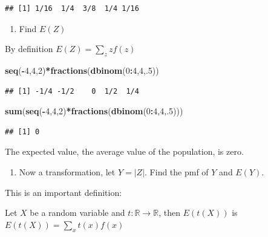 \documentclass[]{book}
\newenvironment{Shaded}{\begin{snugshade}}{\end{snugshade}}
\newcommand{\KeywordTok}[1]{\textcolor[rgb]{0.13,0.29,0.53}{\textbf{#1}}}
\newcommand{\DecValTok}[1]{\textcolor[rgb]{0.00,0.00,0.81}{#1}}
\newcommand{\OperatorTok}[1]{\textcolor[rgb]{0.81,0.36,0.00}{\textbf{#1}}}
\newcommand{\NormalTok}[1]{#1}
\providecommand{\tightlist}{%
  \setlength{\itemsep}{0pt}\setlength{\parskip}{0pt}}
\theoremstyle{definition}
\theoremstyle{definition}
\theoremstyle{definition}
\theoremstyle{remark}
\begin{document}
\begin{verbatim}
## [1] 1/16  1/4  3/8  1/4 1/16
\end{verbatim}

\begin{enumerate}
\def\labelenumi{\arabic{enumi}.}
\tightlist
\item
  Find \(E(Z)\)
\end{enumerate}

By definition \(E(Z)=\sum_{z}zf(z)\)

\begin{Shaded}
\begin{Highlighting}[]
\KeywordTok{seq}\NormalTok{(}\OperatorTok{-}\DecValTok{4}\NormalTok{,}\DecValTok{4}\NormalTok{,}\DecValTok{2}\NormalTok{)}\OperatorTok{*}\KeywordTok{fractions}\NormalTok{(}\KeywordTok{dbinom}\NormalTok{(}\DecValTok{0}\OperatorTok{:}\DecValTok{4}\NormalTok{,}\DecValTok{4}\NormalTok{,.}\DecValTok{5}\NormalTok{))}
\end{Highlighting}
\end{Shaded}

\begin{verbatim}
## [1] -1/4 -1/2    0  1/2  1/4
\end{verbatim}

\begin{Shaded}
\begin{Highlighting}[]
\KeywordTok{sum}\NormalTok{(}\KeywordTok{seq}\NormalTok{(}\OperatorTok{-}\DecValTok{4}\NormalTok{,}\DecValTok{4}\NormalTok{,}\DecValTok{2}\NormalTok{)}\OperatorTok{*}\KeywordTok{fractions}\NormalTok{(}\KeywordTok{dbinom}\NormalTok{(}\DecValTok{0}\OperatorTok{:}\DecValTok{4}\NormalTok{,}\DecValTok{4}\NormalTok{,.}\DecValTok{5}\NormalTok{)))}
\end{Highlighting}
\end{Shaded}

\begin{verbatim}
## [1] 0
\end{verbatim}

The expected value, the average value of the population, is zero.

\begin{enumerate}
\def\labelenumi{\arabic{enumi}.}
\setcounter{enumi}{1}
\tightlist
\item
  Now a transformation, let \(Y=|Z|\). Find the pmf of \(Y\) and
  \(E(Y)\).
\end{enumerate}

This is an important definition:

Let \(X\) be a random variable and
\(t:\mathbb{R}\rightarrow \mathbb{R}\), then \(E(t(X))\) is
\(E(t(X))=\sum_{x}t(x)f(x)\)
\end{document}
